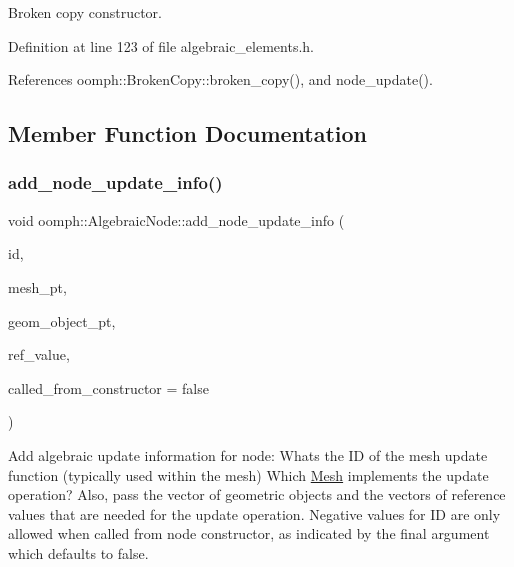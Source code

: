 Broken copy constructor. 



Definition at line 123 of file algebraic\+\_\+elements.\+h.



References oomph\+::\+Broken\+Copy\+::broken\+\_\+copy(), and node\+\_\+update().



\subsection{Member Function Documentation}
\mbox{\label{classoomph_1_1AlgebraicNode_a91900aebc9ddbceaf5fb24b977f25e44}} 
\subsubsection{\texorpdfstring{add\+\_\+node\+\_\+update\+\_\+info()}{add\_node\_update\_info()}\hspace{0.1cm}{\footnotesize\ttfamily [1/2]}}
{\footnotesize\ttfamily void oomph\+::\+Algebraic\+Node\+::add\+\_\+node\+\_\+update\+\_\+info (\begin{DoxyParamCaption}\item[{const int \&}]{id,  }\item[{\hyperlink{classoomph_1_1AlgebraicMesh}{Algebraic\+Mesh} $\ast$}]{mesh\+\_\+pt,  }\item[{const \hyperlink{classoomph_1_1Vector}{Vector}$<$ \hyperlink{classoomph_1_1GeomObject}{Geom\+Object} $\ast$$>$ \&}]{geom\+\_\+object\+\_\+pt,  }\item[{const \hyperlink{classoomph_1_1Vector}{Vector}$<$ double $>$ \&}]{ref\+\_\+value,  }\item[{const bool \&}]{called\+\_\+from\+\_\+constructor = {\ttfamily false} }\end{DoxyParamCaption})\hspace{0.3cm}{\ttfamily [inline]}}



Add algebraic update information for node\+: What\textquotesingle{}s the ID of the mesh update function (typically used within the mesh) Which \hyperlink{classoomph_1_1Mesh}{Mesh} implements the update operation? Also, pass the vector of geometric objects and the vectors of reference values that are needed for the update operation. Negative values for ID are only allowed when called from node constructor, as indicated by the final argument which defaults to false. 



